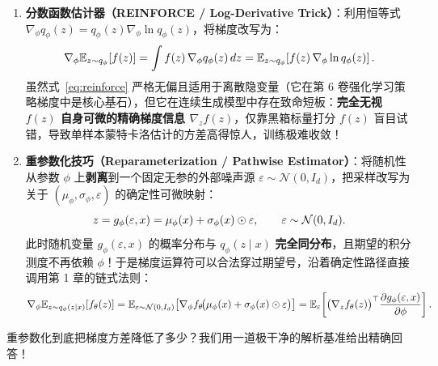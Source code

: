 \begin{enumerate}
  \item \textbf{分数函数估计器（REINFORCE / Log-Derivative Trick）}：利用恒等式 $\nabla_\phi q_\phi(z) = q_\phi(z)\nabla_\phi \ln q_\phi(z)$，将梯度改写为：
  \begin{equation}
    \nabla_\phi \mathbb{E}_{z \sim q_\phi}\!\left[f(z)\right]
    = \int f(z)\,\nabla_\phi q_\phi(z)\,dz
    = \mathbb{E}_{z \sim q_\phi}\!\left[f(z)\,\nabla_\phi \ln q_\phi(z)\right].
    \label{eq:reinforce}
  \end{equation}
  虽然式~\eqref{eq:reinforce} 严格无偏且适用于离散隐变量（它在第 6 卷强化学习策略梯度中是核心基石），但它在连续生成模型中存在致命短板：\textbf{完全无视 $f(z)$ 自身可微的精确梯度信息 $\nabla_z f(z)$}，仅靠黑箱标量打分 $f(z)$ 盲目试错，导致单样本蒙特卡洛估计的方差高得惊人，训练极难收敛！
  \item \textbf{重参数化技巧（Reparameterization / Pathwise Estimator）}：将随机性从参数 $\phi$ 上\textbf{剥离}到一个固定无参的外部噪声源 $\varepsilon \sim \mathcal{N}(0, I_d)$，把采样改写为关于 $(\mu_\phi, \sigma_\phi, \varepsilon)$ 的确定性可微映射：
  \begin{equation}
    z = g_\phi(\varepsilon, x) = \mu_\phi(x) + \sigma_\phi(x) \odot \varepsilon,
    \qquad \varepsilon \sim \mathcal{N}(0, I_d).
    \label{eq:reparam}
  \end{equation}
  此时随机变量 $g_\phi(\varepsilon, x)$ 的概率分布与 $q_\phi(z \mid x)$ \textbf{完全同分布}，且期望的积分测度不再依赖 $\phi$！于是梯度运算符可以合法穿过期望号，沿着确定性路径直接调用第 1 章的链式法则：
  \begin{equation}
    \nabla_\phi \mathbb{E}_{z \sim q_\phi(z \mid x)}\!\left[f_\theta(z)\right]
    = \mathbb{E}_{\varepsilon \sim \mathcal{N}(0, I_d)}\!\left[\nabla_\phi f_\theta\!\big(\mu_\phi(x) + \sigma_\phi(x)\odot \varepsilon\big)\right]
    = \mathbb{E}_{\varepsilon}\!\left[\big(\nabla_z f_\theta(z)\big)^\top \frac{\partial g_\phi(\varepsilon, x)}{\partial \phi}\right].
    \label{eq:reparam-grad}
  \end{equation}
\end{enumerate}

重参数化到底把梯度方差降低了多少？我们用一道极干净的解析基准给出精确回答！

